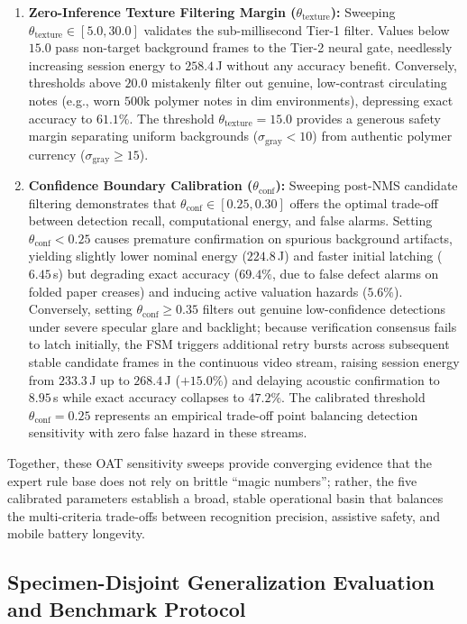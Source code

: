 \documentclass[final,5p,times,twocolumn,authoryear]{elsarticle}
\begin{document}
\begin{enumerate}[label=(\roman*)]
    \item \textbf{Zero-Inference Texture Filtering Margin ($\theta_{\text{texture}}$):} Sweeping $\theta_{\text{texture}} \in [5.0, 30.0]$ validates the sub-millisecond Tier-1 filter. Values below $15.0$ pass non-target background frames to the Tier-2 neural gate, needlessly increasing session energy to $258.4$\,J without any accuracy benefit. Conversely, thresholds above $20.0$ mistakenly filter out genuine, low-contrast circulating notes (e.g., worn $500\text{k}$ polymer notes in dim environments), depressing exact accuracy to $61.1\%$. The threshold $\theta_{\text{texture}} = 15.0$ provides a generous safety margin separating uniform backgrounds ($\sigma_{\text{gray}} < 10$) from authentic polymer currency ($\sigma_{\text{gray}} \ge 15$).
    \item \textbf{Confidence Boundary Calibration ($\theta_{\text{conf}}$):} Sweeping post-NMS candidate filtering demonstrates that $\theta_{\text{conf}} \in [0.25, 0.30]$ offers the optimal trade-off between detection recall, computational energy, and false alarms. Setting $\theta_{\text{conf}} < 0.25$ causes premature confirmation on spurious background artifacts, yielding slightly lower nominal energy ($224.8$\,J) and faster initial latching ($6.45$\,s) but degrading exact accuracy ($69.4\%$, due to false defect alarms on folded paper creases) and inducing active valuation hazards ($5.6\%$). Conversely, setting $\theta_{\text{conf}} \ge 0.35$ filters out genuine low-confidence detections under severe specular glare and backlight; because verification consensus fails to latch initially, the FSM triggers additional retry bursts across subsequent stable candidate frames in the continuous video stream, raising session energy from $233.3$\,J up to $268.4$\,J ($+15.0\%$) and delaying acoustic confirmation to $8.95$\,s while exact accuracy collapses to $47.2\%$. The calibrated threshold $\theta_{\text{conf}} = 0.25$ represents an empirical trade-off point balancing detection sensitivity with zero false hazard in these streams.
\end{enumerate}
Together, these OAT sensitivity sweeps provide converging evidence that the expert rule base does not rely on brittle ``magic numbers''; rather, the five calibrated parameters establish a broad, stable operational basin that balances the multi-criteria trade-offs between recognition precision, assistive safety, and mobile battery longevity.

\subsection{Specimen-Disjoint Generalization Evaluation and Benchmark Protocol}
\label{subsec:specimen_disjoint_results}
\end{document}

